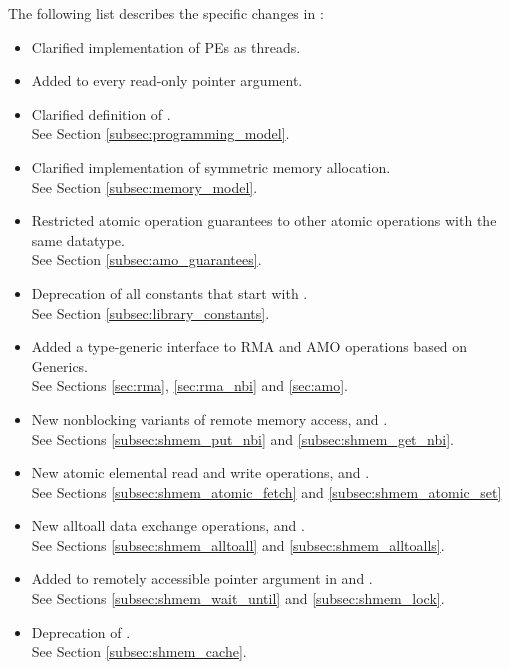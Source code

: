The following list describes the specific changes in \openshmem[1.3]:
\begin{itemize}
%
\item Clarified implementation of \acp{PE} as threads.
%
\item Added  to every read-only pointer argument.
%
\item Clarified definition of .
\\See Section \ref{subsec:programming_model}.
%
\item Clarified implementation of symmetric memory allocation.
\\See Section \ref{subsec:memory_model}.
%
\item Restricted atomic operation guarantees to other atomic operations with the same datatype.
\\See Section \ref{subsec:amo_guarantees}.
%
\item Deprecation of all constants that start with .
\\See Section \ref{subsec:library_constants}.
%
\item Added a type-generic interface to \openshmem \ac{RMA} and \ac{AMO}
	operations based on \Cstd[11] Generics.
\\See Sections \ref{sec:rma}, \ref{sec:rma_nbi} and \ref{sec:amo}.
%
\item New nonblocking variants of remote memory access, 
	and .
\\See Sections \ref{subsec:shmem_put_nbi} and \ref{subsec:shmem_get_nbi}.
%
\item New atomic elemental read and write operations,  and
	.
\\See Sections \ref{subsec:shmem_atomic_fetch} and \ref{subsec:shmem_atomic_set}
%
\item New alltoall data exchange operations, 
	and .
\\See Sections \ref{subsec:shmem_alltoall} and \ref{subsec:shmem_alltoalls}.
%
\item Added  to remotely accessible pointer argument in
	 and .
\\See Sections \ref{subsec:shmem_wait_until} and \ref{subsec:shmem_lock}.
%
\item Deprecation of .
\\See Section \ref{subsec:shmem_cache}.
%
\end{itemize}




